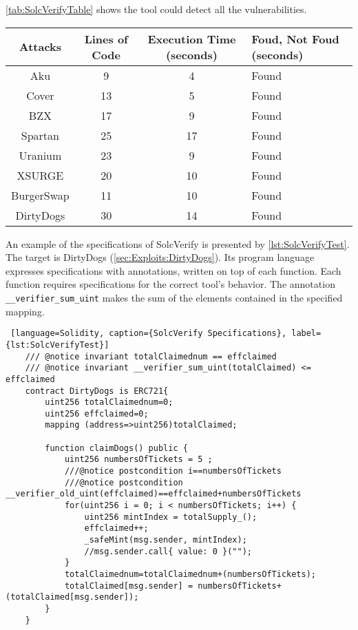 \autoref{tab:SolcVerifyTable} shows the tool could detect all the vulnerabilities.

\begin{center}
    \begin{table*}
        \caption{SolcVerify results}
                \label{tab:SolcVerifyTable}
                \begin{tabular}{cccl}
                \toprule
                    Attacks & Lines of Code & Execution Time (seconds) & Foud, Not Foud (seconds)\\
                    \midrule
                    Aku & 9 & 4 & Found \\ 
                    Cover & 13  & 5 & Found \\ 
                    BZX & 17  & 9  & Found \\ 
                    Spartan & 25 &  17 & Found \\ 
                    Uranium  &  23 & 9 & Found \\ 
                    XSURGE & 20 & 10 & Found \\  
                    BurgerSwap & 11 & 10  & Found \\ 
                    DirtyDogs &  30 &  14& Found \\
                \bottomrule
        \end{tabular}
    \end{table*}
    
\end{center}

An example of the specifications of SolcVerify is presented by \autoref{lst:SolcVerifyTest}.
The target is DirtyDogs (\autoref{sec:Exploits:DirtyDogs}).
Its program language expresses specifications with annotations, written on top of each function.
Each function requires specifications for the correct tool's behavior.
The annotation \texttt{\_\_verifier\_sum\_uint} makes the sum of the elements contained in the specified mapping.

\begin{lstlisting} [language=Solidity, caption={SolcVerify Specifications}, label={lst:SolcVerifyTest}]
    /// @notice invariant totalClaimednum == effclaimed
    /// @notice invariant __verifier_sum_uint(totalClaimed) <= effclaimed
    contract DirtyDogs is ERC721{
        uint256 totalClaimednum=0;
        uint256 effclaimed=0;
        mapping (address=>uint256)totalClaimed;

        function claimDogs() public {
            uint256 numbersOfTickets = 5 ;
            ///@notice postcondition i==numbersOfTickets
            ///@notice postcondition __verifier_old_uint(effclaimed)==effclaimed+numbersOfTickets
            for(uint256 i = 0; i < numbersOfTickets; i++) {
                uint256 mintIndex = totalSupply_();
                effclaimed++;
                _safeMint(msg.sender, mintIndex);
                //msg.sender.call{ value: 0 }("");
            }
            totalClaimednum=totalClaimednum+(numbersOfTickets);
            totalClaimed[msg.sender] = numbersOfTickets+(totalClaimed[msg.sender]);
        }
    }

\end{lstlisting} 


